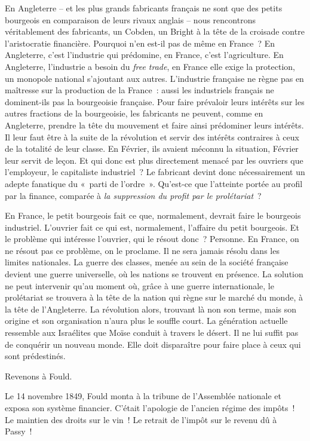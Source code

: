 \documentclass[french,twoside]{book} %
\begin{document}
En Angleterre – et les plus grands fabricants français ne sont que des petits bourgeois en comparaison de leurs rivaux anglais – nous rencontrons véritablement des fabricants, un Cobden, un Bright à la tête de la croisade contre l’aristocratie financière. Pourquoi n’en est-il pas de même en France ? En Angleterre, c’est l’industrie qui prédomine, en France, c’est l’agriculture. En Angleterre, l’industrie a besoin du \emph{free trade}, en France elle exige la protection, un monopole national s’ajoutant aux autres. L’industrie française ne règne pas en maîtresse sur la production de la France : aussi les industriels français ne dominent-ils pas la bourgeoisie française. Pour faire prévaloir leurs intérêts sur les autres fractions de la bourgeoisie, les fabricants ne peuvent, comme en Angleterre, prendre la tête du mouvement et faire ainsi prédominer leurs intérêts. Il leur faut être à la suite de la révolution et servir des intérêts contraires à ceux de la totalité de leur classe. En Février, ils avaient méconnu la situation, Février leur servit de leçon. Et qui donc est plus directement menacé par les ouvriers que l’employeur, le capitaliste industriel ? Le fabricant devint donc nécessairement un adepte fanatique du « parti de l’ordre ». Qu’est-ce que l’atteinte portée au profil par la finance, comparée à \emph{la suppression du profit par le prolétariat} ?\par
En France, le petit bourgeois fait ce que, normalement, devrait faire le bourgeois industriel. L’ouvrier fait ce qui est, normalement, l’affaire du petit bourgeois. Et le problème qui intéresse l’ouvrier, qui le résout donc ? Personne. En France, on ne résout pas ce problème, on le proclame. Il ne sera jamais résolu dans les limites nationales. La guerre des classes, menée au sein de la société française devient une guerre universelle, où les nations se trouvent en présence. La solution ne peut intervenir qu’au moment où, grâce à une guerre internationale, le prolétariat se trouvera à la tête de la nation qui règne sur le marché du monde, à la tête de l’Angleterre. La révolution alors, trouvant là non son terme, mais son origine et son organisation n’aura plus le souffle court. La génération actuelle ressemble aux Israélites que Moïse conduit à travers le désert. Il ne lui suffit pas de conquérir un nouveau monde. Elle doit disparaître pour faire place à ceux qui sont prédestinés.\par
Revenons à Fould.\par
Le 14 novembre 1849, Fould monta à la tribune de l’Assemblée nationale et exposa son système financier. C’était l’apologie de l’ancien régime des impôts ! Le maintien des droits sur le vin ! Le retrait de l’impôt sur le revenu dû à Passy !\par
\end{document}
